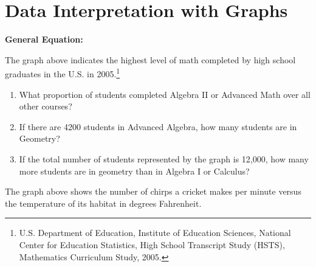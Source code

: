\section{Data Interpretation with Graphs}
\textbf{General Equation:}

\begin{center}
\end{center}

The graph above indicates the highest level of math completed by high school graduates in the U.S. in 2005.\footnote{U.S. Department of Education, Institute of Education Sciences, National Center for Education Statistics, High School Transcript Study (HSTS), Mathematics Curriculum Study, 2005.}

\begin{enumerate}[labelindent=*,style=multiline,leftmargin=*,label=\textbf{Example \arabic*:}]
\item What proportion of students completed Algebra II or Advanced Math over all other courses?
\vfill\item If there are 4200 students in Advanced Algebra, how many students are in Geometry?
\vfill\item If the total number of students represented by the graph is 12,000, how many more students are in geometry than in Algebra I or Calculus?
\end{enumerate}

\vfill
\newpage
\begin{center}
\end{center}

The graph above shows the number of chirps a cricket makes per minute versus the temperature of its habitat in degrees Fahrenheit.

